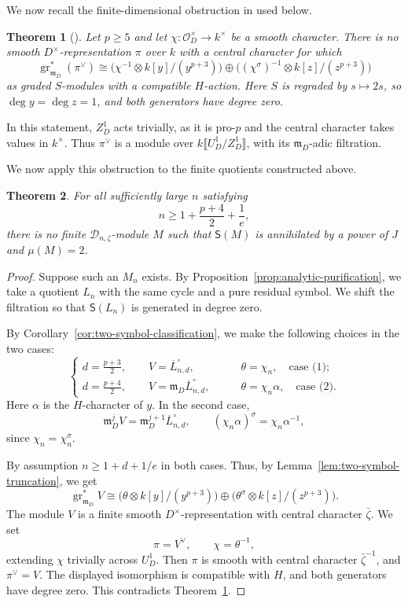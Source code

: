 \documentclass[11pt]{article}
\newtheorem{theorem}{Theorem}[section]
\theoremstyle{definition}
\newcommand{\cO}{\mathcal O}
\newcommand{\mD}{\mathfrak m_D}
\newcommand{\gr}{\operatorname{gr}}
\begin{document}
We now recall the finite-dimensional obstruction in \cite{HuWangPadic} used below.

\begin{theorem}[{\cite[Theorem~2.33]{HuWangPadic}}]
\label{thm:HW-finite-obstruction}
Let $p\geq5$ and let $\chi:\cO_D^\times\to k^\times$ be a
smooth character. There is no smooth $D^\times$-representation
$\pi$ over $k$ with a central character for which
\[
 \gr_{\mD}^*(\pi^\vee)\cong
 \bigl(\chi^{-1}\otimes k[y]/(y^{p+3})\bigr)
 \oplus
 \bigl((\chi^\sigma)^{-1}\otimes k[z]/(z^{p+3})\bigr)
\]
as graded $S$-modules with a compatible $H$-action.
Here $S$ is regraded by $s\mapsto2s$, so $\deg y=\deg z=1$,
and both generators have degree zero.
\end{theorem}

In this statement, $Z_D^1$ acts trivially, as it is pro-$p$ and
the central character takes values in $k^\times$.
Thus $\pi^\vee$ is a module over
$k\llbracket U_D^1/Z_D^1\rrbracket$, with its $\mD$-adic
filtration. %

We now apply this obstruction to the finite quotients constructed above.

\begin{theorem}\label{thm:no-two}
For all sufficiently large $n$ satisfying
\[
 n\geq1+\frac{p+4}{2}+\frac1e,
\]
there is no finite $\mathscr D_{n,\zeta}$-module $M$ such that
$\mathsf S(M)$ is annihilated by a power of $J$ and
$\mu(M)=2$.
\end{theorem}

\begin{proof}
Suppose such an $M_n$ exists. By
Proposition~\ref{prop:analytic-purification}, we take a quotient
$L_n$ with the same cycle and a pure residual symbol. We shift the
filtration so that $\mathsf S(L_n)$ is generated in degree zero.

By Corollary~\ref{cor:two-symbol-classification}, we make the following choices in the two cases:
\[\begin{cases}
 d=\frac{p+3}{2},\qquad
 V=\overline L_{n,d}^\circ,\qquad &\theta=\chi_n, \quad\text{case (1)};\\
 d=\frac{p+4}{2},\qquad
 V=\mD\overline L_{n,d}^\circ,\qquad &\theta=\chi_n\alpha,\quad \text{case (2)}.
\end{cases}
\]
Here $\alpha$ is the $H$-character of $y$. In the second case,
\[
 \mD^jV=\mD^{j+1}\overline{L}_{n,d}^{\circ},\qquad
 (\chi_n\alpha)^\sigma=\chi_n\alpha^{-1},
\]
since $\chi_n=\chi_n^\sigma$.

By assumption $n\geq1+d+1/e$ in both
cases. Thus, by Lemma~\ref{lem:two-symbol-truncation}, we get
\[
 \gr_{\mD}^*V
 \cong\bigl(\theta\otimes k[y]/(y^{p+3})\bigr)
       \oplus\bigl(\theta^\sigma\otimes k[z]/(z^{p+3})\bigr).
\]
The module $V$ is a finite smooth $D^\times$-representation
with central character $\bar\zeta$. We set
\[
 \pi=V^\vee,\qquad \chi=\theta^{-1},
\]
extending $\chi$ trivially across $U_D^1$.
Then $\pi$ is smooth with central character $\bar\zeta^{-1}$,
and $\pi^\vee=V$. The displayed isomorphism is compatible with
$H$, and both generators have degree zero. This contradicts
Theorem~\ref{thm:HW-finite-obstruction}.
\end{proof}
\end{document}
